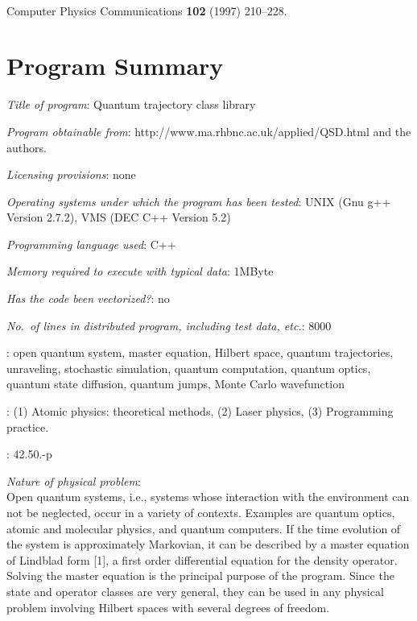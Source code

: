 \vfill

 \\
Computer Physics Communications {\bf 102} (1997) 210--228.

\newpage

\section*{Program Summary}

{\it Title of program\/}: Quantum trajectory class library 

\vspace{3mm}\noindent
{\it Program obtainable from\/}: 
http://www.ma.rhbnc.ac.uk/applied/QSD.html and the authors.

\vspace{3mm}\noindent
{\it Licensing provisions\/}: none

\vspace{3mm}\noindent
{\it Operating systems under which the program has been tested\/}:
UNIX (Gnu g++ Version 2.7.2), VMS (DEC C++ Version 5.2)

\vspace{3mm}\noindent
{\it Programming language used\/}: C++

\vspace{3mm}\noindent
{\it Memory required to execute with typical data\/}: 1MByte

\vspace{3mm}\noindent
{\it Has the code been vectorized?\/}: no

\vspace{3mm}\noindent
{\it No.~of lines in distributed program, including test data, etc.}: 8000

\vspace{3mm}: open quantum system, master equation,
Hilbert space, quantum trajectories, unraveling, stochastic simulation, quantum
computation, quantum optics, quantum state diffusion, quantum jumps, Monte
Carlo wavefunction

\vspace{3mm}: (1)
Atomic physics: theoretical methods, (2) Laser physics, (3)
Programming practice.

\vspace{3mm}: 42.50.-p

\vspace{3mm}\noindent
{\it Nature of physical problem\/}:\\
Open quantum systems, i.e., systems whose interaction with the environment
can not be neglected, occur in a variety of contexts. Examples are quantum
optics, atomic and molecular physics, and quantum computers. If the time
evolution of the system is approximately Markovian, it can be described by a
master equation of Lindblad form [1], a first order differential equation for
the density operator. Solving the master equation is the principal purpose of
the program. Since the state and operator classes are very general, they can
be used in any physical problem involving Hilbert spaces with several degrees
of freedom.

